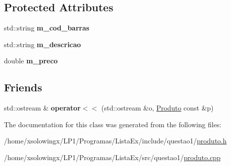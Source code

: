 \subsection*{Protected Attributes}
\begin{DoxyCompactItemize}
\item 
\mbox{\label{classProduto_a2e772f6b851f2a2c7d7bc6853af7ca83}} 
std\+::string {\bfseries m\+\_\+cod\+\_\+barras}
\item 
\mbox{\label{classProduto_aacf69c2cf01b6040138767a47c1e3f4b}} 
std\+::string {\bfseries m\+\_\+descricao}
\item 
\mbox{\label{classProduto_af4f68aad97167802a1dca2b8ddb188eb}} 
double {\bfseries m\+\_\+preco}
\end{DoxyCompactItemize}
\subsection*{Friends}
\begin{DoxyCompactItemize}
\item 
\mbox{\label{classProduto_a3f8bbab15d5b8943ac04af1bc6eec1bf}} 
std\+::ostream \& {\bfseries operator$<$$<$} (std\+::ostream \&o, \hyperlink{classProduto}{Produto} const \&p)
\end{DoxyCompactItemize}


The documentation for this class was generated from the following files\+:\begin{DoxyCompactItemize}
\item 
/home/xsolowingx/\+L\+P1/\+Programas/\+Lista\+Ex/include/questao1/\hyperlink{produto_8h}{produto.\+h}\item 
/home/xsolowingx/\+L\+P1/\+Programas/\+Lista\+Ex/src/questao1/\hyperlink{produto_8cpp}{produto.\+cpp}\end{DoxyCompactItemize}
